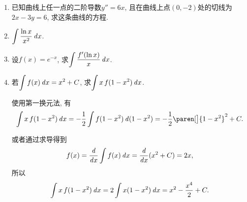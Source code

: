 \documentclass[a4paper,punct=CCT]{ctexbook}
\newcommand*{\mreason}[1]{#1}
\newcommand*{\disp}[1]{\( \displaystyle #1 \)}
\theoremstyle{break}
\newif\ifshowsol
\begin{document}
\begin{enumerate}
\item 已知曲线上任一点的二阶导数\(y'' = 6x\), 且在曲线上点\((0, -2)\)处的切线为\(2x - 3y = 6\), 求这条曲线的方程.

  \ifshowsol
  将切线的方程化为点斜式, 得到\(y = 2x/3 - 2\), 所以\(y'\big\vert_{x=0} = 2/3\).  有
  \[
    y' = \int y'' \dx = \int 6x \dx = 3x^2 + c_1,
  \]
  所以\(c_1 = 2/3\). 又有
  \[
    y = \int y' \dx = \int \paren[\Big]{3x^2 + \frac23} \dx = x^3 + \frac23 x + c_2,
  \]
  所以\(c_2 = -2\).  这条曲线的方程是
  \[
    y = x^3 + \frac23 x - 2.
  \]
  \fi

\item \disp{\int \frac{\ln x}{x^2} \dx}.

  \ifshowsol
  最好的办法是用\(x = e^t\)换元后用分部积分法, 可惜这里还没学到.  有
  \begin{align*}
    \int \frac{\ln x}{x^2} \dx
    &= \int t e^{-t} \dt
    && \mreason{x = e^t} \\
    &= - \int t \diff e^{-t} \\
    &= - \paren[\Big]{t e^{-t} - \int e^{-t} \dt} \\
    &= - t e^{-t} - e^{-t} + C \\
    &= - \frac{\ln x}{x} - \frac1x + C.
  \end{align*}
  \fi

\item 设\(f(x) = e^{-x}\), 求\disp{\int \frac{f'(\ln x)}{x} \dx}.

  \ifshowsol
  使用第一换元法, 有
  \begin{equation*}
    \int \frac{f'(\ln x)}{x} \dx
    = \int f'(\ln x) \diff (\ln x)
    = f(\ln x) = \frac1x + C.
  \end{equation*}

  也可以直接求导\(f'(x) = - e^{-x}\), 然后直接代入, 有
  \begin{equation*}
    \int \frac{f'(\ln x)}{x} \dx
    = - \int \frac{1}{x^2} \dx
    = \frac1x + C.
  \end{equation*}
  \fi

\item 若\disp{\int f(x) \dx = x^2 + C}, 求\disp{\int x \, f(1-x^2) \dx}.

  \ifshowsol
  使用第一换元法, 有
  \begin{align*}
    \int x \, f(1-x^2) \dx
    = - \frac12 \int f(1-x^2) \diff (1-x^2)
    = - \frac12 \paren[\big]{1-x^2}^2 + C.
  \end{align*}

  或者通过求导得到
  \[
    f(x) = \frac{\mathop{}\!\mathit{d}}{\mathop{}\!\mathit{d} x} \int f(x) \mathop{}\!\mathit{d} x = \frac{\mathop{}\!\mathit{d}}{\mathop{}\!\mathit{d} x} (x^2 + C) = 2x,
  \]
  所以
  \[
    \int x \, f(1-x^2) \mathop{}\!\mathit{d} x
    = 2 \int x (1-x^2) \mathop{}\!\mathit{d} x
    = x^2 - \frac{x^4}{2} + C.
  \]


\end{enumerate}
\end{document}
